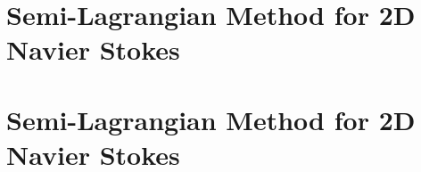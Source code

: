 \documentclass[11pt,letterpaper]{article}
\begin{document}
\begin{figure}[H]
    \caption{}\label{fig:conv_order_finu_}
\end{figure}

\section{Semi-Lagrangian Method for 2D Navier Stokes}\label{sec:nonli_adv}



\section{Semi-Lagrangian Method for 2D Navier Stokes}\label{sec:adv_NS}


\newpage


\end{document}
